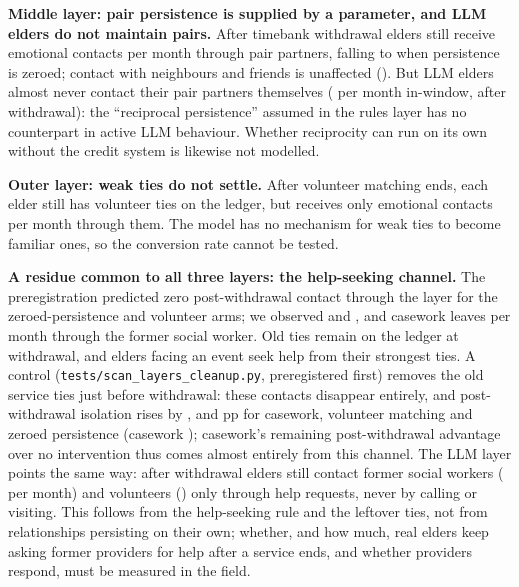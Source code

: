 \documentclass[10pt,twocolumn]{article}
\begin{document}
\textbf{Middle layer: pair persistence is supplied by a parameter, and LLM elders do not maintain pairs.} After timebank withdrawal elders still receive \LyTbPairPost{} emotional contacts per month through pair partners, falling to \LyTbZeroPairPost{} when persistence is zeroed; contact with neighbours and friends is unaffected (\LyCPeerPost). But LLM elders almost never contact their pair partners themselves (\LyLlmTbPairIv{} per month in-window, \LyLlmTbPairPost{} after withdrawal): the ``reciprocal persistence'' assumed in the rules layer has no counterpart in active LLM behaviour. Whether reciprocity can run on its own without the credit system is likewise not modelled.

\textbf{Outer layer: weak ties do not settle.} After volunteer matching ends, each elder still has \LyVolTiesPost{} volunteer ties on the ledger, but receives only \LyPfVolPost{} emotional contacts per month through them. The model has no mechanism for weak ties to become familiar ones, so the conversion rate cannot be tested.

\textbf{A residue common to all three layers: the help-seeking channel.} The preregistration predicted zero post-withdrawal contact through the layer for the zeroed-persistence and volunteer arms; we observed \LyTbZeroPairPost{} and \LyPfVolPost, and casework leaves \LyCwSwPost{} per month through the former social worker. Old ties remain on the ledger at withdrawal, and elders facing an event seek help from their strongest ties. A control (\texttt{tests/scan\_layers\_cleanup.py}, preregistered first) removes the old service ties just before withdrawal: these contacts disappear entirely, and post-withdrawal isolation rises by \LyCleanCwIso, \LyCleanPfIso{} and \LyCleanTbZeroIso{} pp for casework, volunteer matching and zeroed persistence (casework \LyCleanCwIsoCI); casework's remaining post-withdrawal advantage over no intervention thus comes almost entirely from this channel. The LLM layer points the same way: after withdrawal elders still contact former social workers (\LyLlmCwSwPost{} per month) and volunteers (\LyLlmPfVolPost) only through help requests, never by calling or visiting. This follows from the help-seeking rule and the leftover ties, not from relationships persisting on their own; whether, and how much, real elders keep asking former providers for help after a service ends, and whether providers respond, must be measured in the field.
\end{document}
